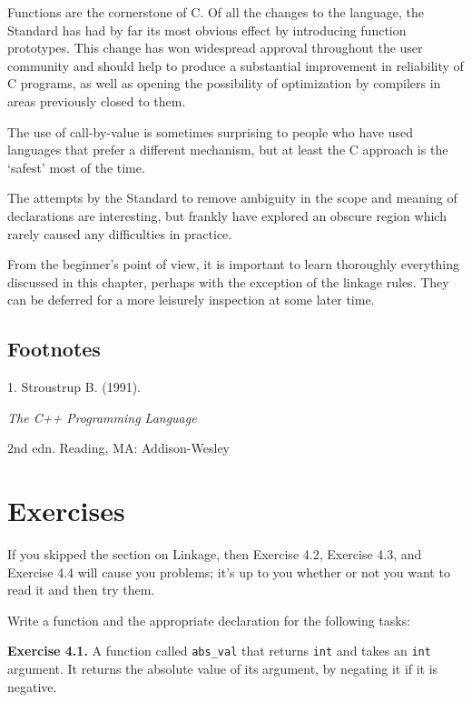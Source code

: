   Functions are the cornerstone of C. Of all the changes to the language,
   the Standard has had by far its most obvious effect by introducing
   function prototypes. This change has won widespread approval throughout
   the user community and should help to produce a substantial improvement
   in reliability of C programs, as well as opening the possibility of
   optimization by compilers in areas previously closed to them.


  The use of call-by-value is sometimes surprising to people who have
   used languages that prefer a different mechanism, but at least the C
   approach is the `safest' most of the time.


  The attempts by the Standard to remove ambiguity in the scope and
   meaning of declarations are interesting, but frankly have explored an
   obscure region which rarely caused any difficulties in practice.


  From the beginner's point of view, it is important to learn thoroughly
   everything discussed in this chapter, perhaps with the exception of the
   linkage rules. They can be deferred for a more leisurely inspection at
   some later time.

 \subsection{Footnotes}1. Stroustrup
     B. (1991). \begin{center}\textit{The C++ Programming Language}\end{center}

 2nd edn.
     Reading, MA: Addison-Wesley


        \section{Exercises}
        


  If you skipped the section on Linkage, then Exercise 4.2,
   Exercise 4.3, and Exercise 4.4 will cause you
   problems; it's up to you whether or not you want to read it and then try
   them.


  Write a function and the appropriate declaration for the following
   tasks:


  \textbf{Exercise 4.1.} A function called \texttt{abs\_val} that returns
   \texttt{int} and takes an \texttt{int} argument. It returns the
   absolute value of its argument, by negating it if it is
   negative.


